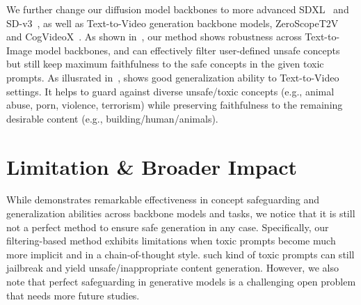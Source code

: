 We further change our diffusion model backbones to more advanced SDXL~\citep{podell2023sdxl} and SD-v3~\citep{2024sdv3}, as well as Text-to-Video generation backbone models, ZeroScopeT2V~\citep{2023zeroscope} and CogVideoX~\citep{yang2024cogvideox}. 
As shown in~, our method shows robustness across Text-to-Image model backbones, and can effectively filter user-defined unsafe concepts but still keep maximum faithfulness to the safe concepts in the given toxic prompts. 
As illusrated in~, \ours{} shows good generalization ability to Text-to-Video settings. It helps to guard against diverse unsafe/toxic concepts (e.g., animal abuse, porn, violence, terrorism) while preserving faithfulness to the remaining desirable content (e.g., building/human/animals).  







\section{Limitation \& Broader Impact} \label{app:limitation}
While \ours{} demonstrates remarkable effectiveness in concept safeguarding and generalization abilities across backbone models and tasks, we notice that it is still not a perfect method to ensure safe generation in any case. Specifically, our filtering-based \ours{} method exhibits limitations when toxic prompts become much more implicit and in a chain-of-thought style. such kind of toxic prompts can still jailbreak \ours{} and yield unsafe/inappropriate content generation. However, we also note that perfect safeguarding in generative models is a challenging open problem that needs more future studies.

